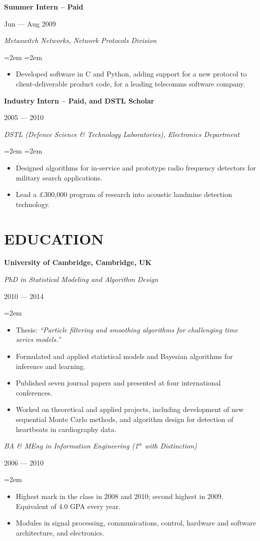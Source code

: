 \documentclass[letterpaper,10pt]{article}
\newcommand{\sepspace}{\vspace*{0.3em}}
\newcommand{\NewPart}[1]{\vspace{-1em} \section*{\uppercase{#1}}}
\newcommand{\MainHeading}[1]{\noindent\textbf{#1}}
\newcommand{\SubHeading}[1]{\noindent\textit{#1}}
\newcommand{\DateBox}[1]{\colorbox{light-gray}{\parbox{8em}{\hfill\color{White}#1}}}
\newcommand{\Details}[1]{\hangindent=2em\hangafter=0\small#1\normalsize\par}
\newcommand{\WorkEntry}[4]{%
                \MainHeading{#1} \hfill \DateBox{#2} \par
                \SubHeading{#3} \par
                \noindent \hangindent=2em \hangafter=0 \Details{#4} }
\newcommand{\EducationEntry}[3]{%
                \SubHeading{#1} \hfill \DateBox{#2} \par
                \Details{#3} }
\begin{document}
\WorkEntry{Summer Intern -- Paid}{Jun --- Aug 2009}{Metaswitch Networks, Network Protocols Division}{
\begin{itemize}
  \item Developed software in C and Python, adding support for a new protocol to client-deliverable product code, for a leading telecomms software company.
\end{itemize}
}
\sepspace

\WorkEntry{Industry Intern -- Paid, and DSTL Scholar}{2005 --- 2010}{DSTL (Defence Science \& Technology Laboratories), Electronics Department}{
\begin{itemize}
  \item Designed algorithms for in-service and prototype radio frequency detectors for military search applications.
  \item Lead a \pounds300,000 program of research into acoustic landmine detection technology.
\end{itemize}
}



\NewPart{Education}

\MainHeading{University of Cambridge, Cambridge, UK}

\EducationEntry{PhD in Statistical Modeling and Algorithm Design}{2010 --- 2014}{
\begin{itemize}
 \item Thesis: \textit{``Particle filtering and smoothing algorithms for challenging time series models.''}
 \item Formulated and applied statistical models and Bayesian algorithms for inference and learning.
 \item Published seven journal papers and presented at four international conferences.
 \item Worked on theoretical and applied projects, including development of new sequential Monte Carlo methods, and algorithm design for detection of heartbeats in cardiography data.
\end{itemize}
}
\sepspace

\EducationEntry{BA \& MEng in Information Engineering (1$^{\text{st}}$ with Distinction)}{2006 --- 2010}{
\begin{itemize}
  \item Highest mark in the class in 2008 and 2010; second highest in 2009. Equivalent of 4.0 GPA every year.
  \item Modules in signal processing, communications, control, hardware and software architecture, and electronics.
\end{itemize}
}
\end{document}
